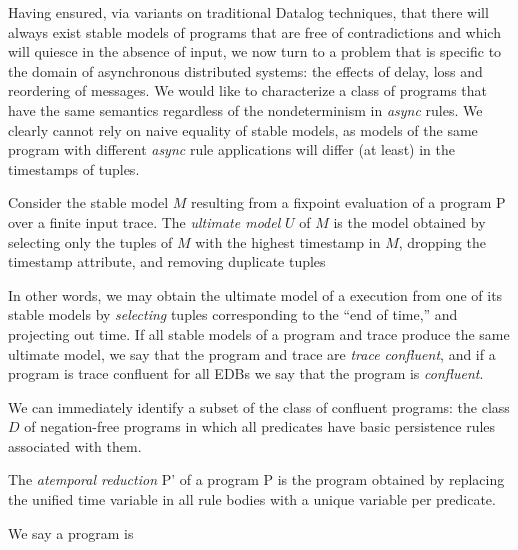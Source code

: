 Having ensured, via variants on traditional Datalog techniques, that there will always exist 
stable models  of \lang programs that are free of contradictions and which will quiesce in the absence of input, we now turn to a problem that is specific to the domain of asynchronous
distributed systems: the effects of delay, loss and reordering of messages. We would like to
characterize a class of \lang programs that have the same semantics regardless of
the nondeterminism in {\em async} rules.  We clearly cannot rely on naive equality of stable
models, as models of the same program with different {\em async} rule applications will differ
(at least) in the timestamps of tuples.

\begin{definition}
Consider the stable model $M$ resulting from a fixpoint evaluation of a \lang program P over a finite input trace.  The \emph{ultimate model} $U$ of $M$ is the model obtained by selecting only the tuples of $M$ with the highest timestamp in $M$, dropping the timestamp attribute,
and removing duplicate tuples
\end{definition}

In other words, we may obtain the ultimate model of a \lang execution from one of its stable
models by {\em selecting} tuples corresponding to the ``end of time,'' and projecting out time.
If all stable models of a \lang program and trace produce the same ultimate model, we say that the program and trace are \emph{trace confluent}, and if a program is trace confluent for all EDBs we say that the program is \emph{confluent}.

We can immediately identify a subset of the class of confluent programs:
the class $D$ of negation-free \lang programs in which all predicates have basic 
persistence rules associated with them.  

\begin{definition}
The \emph{atemporal reduction} P' of a \lang program P is the program obtained by replacing 
the unified time variable in all rule bodies with a unique variable per predicate.  
\end{definition}

We say a \lang program is \

